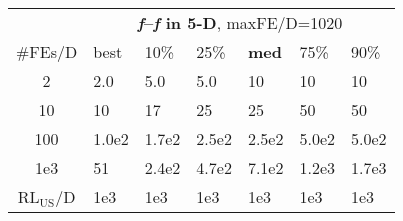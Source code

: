 \begin{tabular}{c|llllll}
 & \multicolumn{6}{|c}{\textbf{\textit{f}\raisebox{-0.35ex}{1}--\textit{f}\raisebox{-0.35ex}{55} in 5-D}, maxFE/D=1020}\\
\#FEs/D & best & 10\% & 25\% & \textbf{med} & 75\% & 90\%\\
2 & \hspace*{1ex}2.0 & \hspace*{1ex}5.0 & \hspace*{1ex}5.0 & 10 & 10 & 10\\
10 & 10 & 17 & 25 & 25 & 50 & 50\\
100 & 1.0e2 & 1.7e2 & 2.5e2 & 2.5e2 & 5.0e2 & 5.0e2\\
1e3 & 51 & 2.4e2 & 4.7e2 & 7.1e2 & 1.2e3 & 1.7e3\\
$\text{RL}_{\text{US}}$/D & 1e3 & 1e3 & 1e3 & 1e3 & 1e3 & 1e3
\end{tabular}
